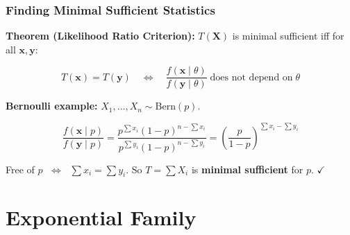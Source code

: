 \documentclass[aspectratio=169]{beamer}
\begin{document}
\begin{frame}
\frametitle{Finding Minimal Sufficient Statistics}

\small
\textbf{Theorem (Likelihood Ratio Criterion):} $T(\mathbf{X})$ is minimal sufficient iff for all $\mathbf{x}, \mathbf{y}$:

$$T(\mathbf{x}) = T(\mathbf{y}) \quad\Longleftrightarrow\quad \frac{f(\mathbf{x} \mid \theta)}{f(\mathbf{y} \mid \theta)} \;\text{does not depend on}\; \theta$$

\vspace{0.15cm}
\textbf{Bernoulli example:} $X_1, \ldots, X_n \sim \text{Bern}(p)$.

$$\frac{f(\mathbf{x} \mid p)}{f(\mathbf{y} \mid p)}
= \frac{p^{\sum x_i}(1-p)^{n-\sum x_i}}{p^{\sum y_i}(1-p)^{n-\sum y_i}}
= \left(\frac{p}{1-p}\right)^{\!\sum x_i - \sum y_i}$$

Free of $p$ $\;\Longleftrightarrow\;$ $\sum x_i = \sum y_i$.
\;\;So $T = \sum X_i$ is \textbf{minimal sufficient} for $p$. \;\textcolor{paramgreen}{$\checkmark$}

\vspace{0.2cm}
\begin{center}
\end{center}
\end{frame}

\section{Exponential Family}
\end{document}
